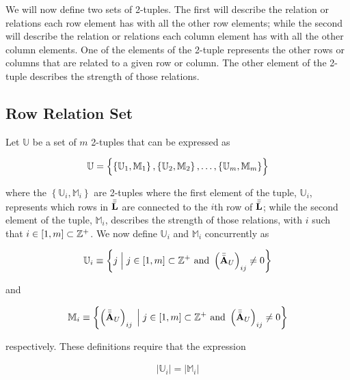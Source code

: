 \documentclass[../ClusteringConnectionsMAIN.tex]{subfiles}
\begin{document}
\begin{flushleft}
\begin{large}


We will now define two sets of 2-tuples.  The first will describe the relation or relations each row element has with all the other row elements; while the second will describe the relation or relations each column element has with all the other column elements.  One of the elements of the 2-tuple represents the other rows or columns that are related to a given row or column.  The other element of the 2-tuple describes the strength of those relations. 


\subsection{Row Relation Set}

Let $\mathbb{U}$ be a set of $m$ 2-tuples that can be expressed as

\begin{align*}
\mathbb{U} = \Bigl\{ \left\{ \mathbb{U}_1, \mathbb{M}_1 \right\}, \left\{ \mathbb{U}_2, \mathbb{M}_2 \right\}, \dots, \left\{ \mathbb{U}_m, \mathbb{M}_m \right\} \Bigr\}
\end{align*}

where the $\left\{ \mathbb{U}_i, \mathbb{M}_i \right\}$ are 2-tuples where the first element of the tuple, $\mathbb{U}_i$, represents which rows in $\bar{\bar{\mathbf{L}}}$ are connected to the $i$th row of $\bar{\bar{\mathbf{L}}}$; while the second element of the tuple, $\mathbb{M}_i$, describes the strength of those relations, with $i$ such that $i \in \left[ 1, m \right] \subset \mathbb{Z}^+$.  We now define $\mathbb{U}_i$ and $\mathbb{M}_i$ concurrently as

\begin{align}
\mathbb{U}_i \equiv \left\{ j \; \Bigl| \Bigr. \; j \in \left[ 1, m \right] \subset \mathbb{Z}^+ \text{  and  } \left( \bar{\bar{\mathbf{A}}}_U \right)_{ij} \neq 0 \right\}
\end{align}

and

\begin{align}
\mathbb{M}_i \equiv \left\{ \left( \bar{\bar{\mathbf{A}}}_U \right)_{ij} \; \Bigl| \Bigr. \; j \in \left[ 1, m \right] \subset \mathbb{Z}^+ \text{  and  } \left( \bar{\bar{\mathbf{A}}}_U \right)_{ij} \neq 0 \right\}
\end{align}

respectively.  These definitions require that the expression

\begin{align*}
\bigl| \mathbb{U}_i \bigr| = \bigl| \mathbb{M}_i \bigr|
\end{align*}


\end{large}
\end{flushleft}
\end{document}
